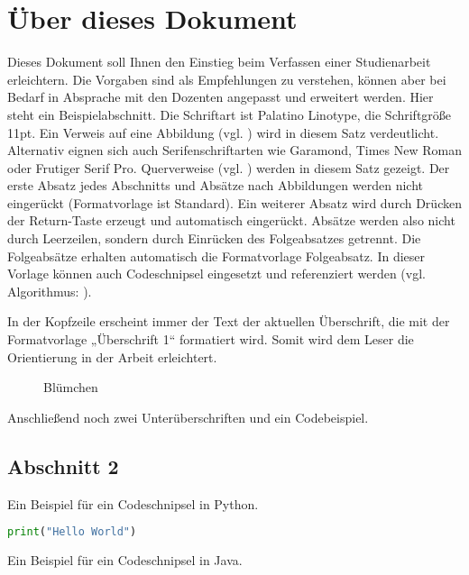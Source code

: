 \documentclass{mi-document/mi-graduation}
\begin{document}
\section{Über dieses Dokument}
Dieses Dokument soll Ihnen den Einstieg beim Verfassen einer Studienarbeit erleichtern. Die Vorgaben sind als Empfehlungen zu verstehen, können aber bei Bedarf in Absprache mit den Dozenten angepasst und erweitert werden. Hier steht ein Beispielabschnitt. Die Schriftart ist Palatino Linotype, die Schriftgröße 11pt. Ein Verweis auf eine Abbildung (vgl. ) wird in diesem Satz verdeutlicht. Alternativ eignen sich auch Serifenschriftarten wie Garamond, Times New Roman oder Frutiger Serif Pro. Querverweise (vgl. ) werden in diesem Satz  gezeigt. Der erste Absatz jedes Abschnitts und Absätze nach Abbildungen werden nicht eingerückt (Formatvorlage ist Standard). Ein weiterer Absatz wird durch Drücken der Return-Taste erzeugt und automatisch eingerückt. Absätze werden also nicht durch Leerzeilen, sondern durch Einrücken des Folgeabsatzes getrennt. Die Folgeabsätze erhalten automatisch die Formatvorlage Folgeabsatz.
In dieser Vorlage können auch Codeschnipsel eingesetzt und referenziert werden (vgl. Algorithmus: ).

In der Kopfzeile erscheint immer der Text der aktuellen Überschrift, die mit der Formatvorlage „Überschrift 1“ formatiert wird. Somit wird dem Leser die Orientierung in der Arbeit erleichtert.\\

\begin{figure}[h!]
	\caption{Blümchen \citep{Norman:2002}}
	\label{img:norman2010}
\end{figure}

Anschließend noch zwei Unterüberschriften und ein Codebeispiel.

\subsection{Abschnitt 2}\label{section:2}
Ein Beispiel für ein Codeschnipsel in Python.\\

\begin{lstlisting}[captionpos=b, belowcaptionskip=4pt, caption=Hello World (Python), label=helloworld, language=Python]
print("Hello World")
\end{lstlisting}

Ein Beispiel für ein Codeschnipsel in Java.\\
\end{document}
